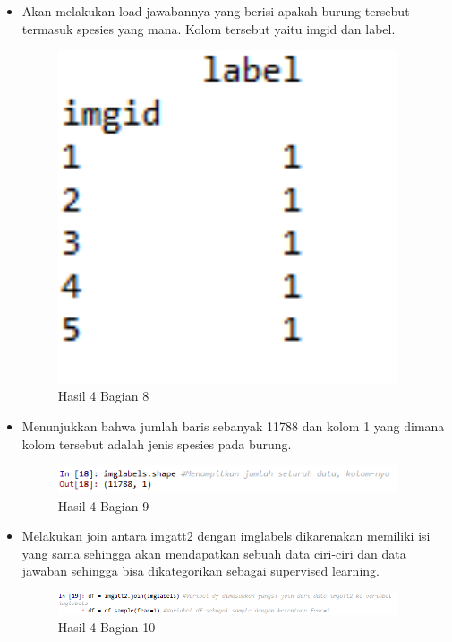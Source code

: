 \begin{itemize}
\item Akan melakukan load jawabannya yang berisi apakah burung tersebut termasuk spesies yang mana. Kolom tersebut yaitu imgid dan label.

\begin{figure}[H]
\centerline{\includegraphics[width=10cm]{figures/1174087/3/15.png}}
\caption{Hasil 4 Bagian 8}
\label{labelgambar}
\end{figure}

\item Menunjukkan bahwa jumlah baris sebanyak 11788 dan kolom 1 yang dimana kolom tersebut adalah jenis spesies pada burung.

\begin{figure}[H]
\centerline{\includegraphics[width=10cm]{figures/1174087/3/16.png}}
\caption{Hasil 4 Bagian 9}
\label{labelgambar}
\end{figure}

\item Melakukan join antara imgatt2 dengan imglabels dikarenakan memiliki isi yang sama sehingga akan mendapatkan sebuah data ciri-ciri dan data jawaban sehingga bisa dikategorikan sebagai supervised learning.

\begin{figure}[H]
\centerline{\includegraphics[width=10cm]{figures/1174087/3/17.png}}
\caption{Hasil 4 Bagian 10}
\label{labelgambar}
\end{figure}


\end{itemize}
